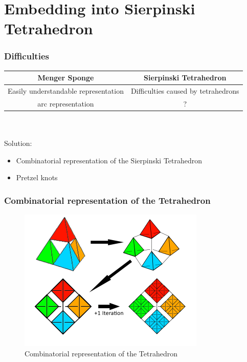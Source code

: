 \section{Embedding into Sierpinski Tetrahedron}

\begin{frame}
	\frametitle{Difficulties}
	\begin{center}
	\begin{tabular}{|c|c|}
		\hline
		\textbf{Menger Sponge} & \textbf{Sierpinski Tetrahedron} \\
		\hline
		Easily understandable representation  & Difficulties caused by tetrahedrons \\
		\hline
		arc representation & ? \\
		\hline
	\end{tabular}
	\end{center}\\
	\\
	\onslide<2->
	Solution:
	\begin{itemize}
		\item Combinatorial representation of the Sierpinski Tetrahedron
		\item Pretzel knots
	\end{itemize}
	
\end{frame}

\begin{frame}
	\frametitle{Combinatorial representation of the Tetrahedron} %
	\begin{figure}[h]
		\centering
		\includegraphics[width=0.5\linewidth]{images/CombRep1}
		\caption{Combinatorial representation of the Tetrahedron \cite{broden2024knotsinsidefractals}}
		\label{fig:enter-label}
	\end{figure}
\end{frame}

